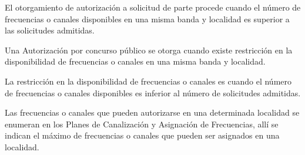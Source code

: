 \documentclass[11pt]{article}
\begin{document}
El otorgamiento de 
autorización a solicitud de parte procede cuando el número de frecuencias o canales 
disponibles  en  una  misma  banda  y  localidad  es 
superior a las solicitudes admitidas.

Una Autorización por concurso público se otorga cuando existe restricción en la disponibilidad de 
frecuencias  o  canales  en  una  misma  banda  y 
localidad. 

La restricción en la disponibilidad de frecuencias o canales es  cuando  el  número  de  frecuencias  o  canales 
disponibles  es  inferior  al  número  de  solicitudes 
admitidas.

Las frecuencias o 
canales que pueden autorizarse en una 
determinada localidad se  enumeran  en  los  Planes  de  Canalización  y 
Asignación de Frecuencias, allí se indican el 
máximo de frecuencias o canales que pueden ser 
asignados en una localidad. 
	
\end{document}
